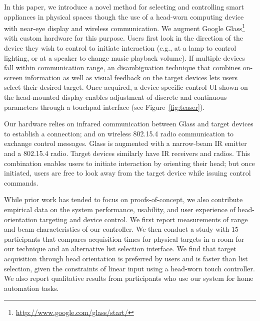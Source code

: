 In this paper, we introduce a novel method for selecting and controlling smart appliances in physical spaces though the use of a head-worn computing device with near-eye display and wireless communication. We augment Google Glass\footnote{\url{http://www.google.com/glass/start/}} with custom hardware for this purpose. Users first look in the direction of the device they wish to control to initiate interaction (e.g., at a lamp to control lighting, or at a speaker to change music playback volume).  If multiple devices fall within communication range, an disambiguation technique that combines on-screen information as well as visual feedback on the target devices lets users select their desired target. Once acquired, a device specific control UI shown on the head-mounted display enables adjustment of discrete and continuous parameters through a touchpad interface (see Figure~\ref{fig:teaser}).

Our hardware relies on infrared communication between Glass and target devices to establish a connection; and on wireless 802.15.4 radio communication to exchange control messages.  Glass is augmented with a narrow-beam IR emitter and a 802.15.4 radio. Target devices similarly have IR receivers and radios. This combination enables users to initiate interaction by orienting their head; but once initiated, users are free to look away from the target device while issuing control commands.

While prior work has tended to focus on proofs-of-concept, we also contribute empirical data on the system performance, usability, and user experience of  head-orientation targeting and device control. We first report measurements of range and beam characteristics of our controller. We then conduct a study with $15$ participants that compares acquisition times for physical targets in a room for our technique and an alternative list selection interface. We find that target acquisition through head orientation is preferred by users and is faster than list selection, given the constraints of linear input using a head-worn touch controller. We also report qualitative results from participants who use our system for home automation tasks.






